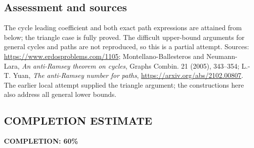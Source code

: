 \subsection*{Assessment and sources}
The cycle leading coefficient and both exact path expressions are attained from below; the triangle case is fully proved. The difficult upper-bound arguments for general cycles and paths are not reproduced, so this is a partial attempt. Sources: \url{https://www.erdosproblems.com/1105}; Montellano-Ballesteros and Neumann-Lara, \emph{An anti-Ramsey theorem on cycles}, Graphs Combin. 21 (2005), 343--354; L.-T. Yuan, \emph{The anti-Ramsey number for paths}, \url{https://arxiv.org/abs/2102.00807}. The earlier local attempt supplied the triangle argument; the constructions here also address all general lower bounds.
\subsection*{COMPLETION ESTIMATE}
\textbf{COMPLETION: 60\%}
